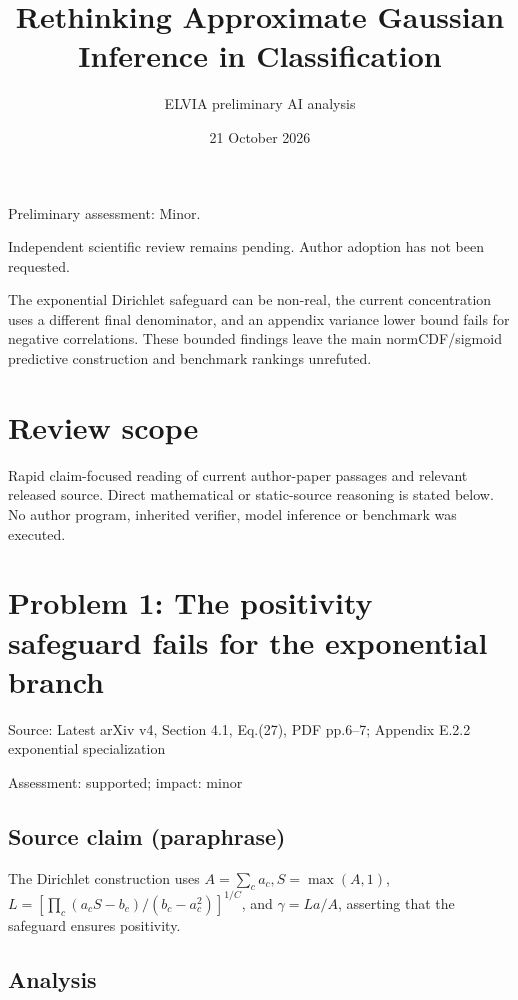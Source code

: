 \documentclass[11pt]{article}
\begin{document}
\title{Rethinking Approximate Gaussian Inference in Classification}

\author{ELVIA preliminary AI analysis}\date{21 October 2026}\maketitle

Preliminary assessment: Minor.\par

Independent scientific review remains pending. Author adoption has not been requested.

The exponential Dirichlet safeguard can be non-real, the current concentration uses a different final denominator, and an appendix variance lower bound fails for negative correlations. These bounded findings leave the main normCDF/sigmoid predictive construction and benchmark rankings unrefuted.

\section*{Review scope}

Rapid claim-focused reading of current author-paper passages and relevant released source. Direct mathematical or static-source reasoning is stated below. No author program, inherited verifier, model inference or benchmark was executed.

\section*{Problem 1: The positivity safeguard fails for the exponential branch}

Source: Latest arXiv v4, Section 4.1, Eq.(27), PDF pp.6–7; Appendix E.2.2 exponential specialization

Assessment: supported; impact: minor

\subsection*{Source claim (paraphrase)}

The Dirichlet construction uses \(A=\sum_ca_c,S=\max(A,1)\), \(L=[\prod_c(a_cS-b_c)/(b_c-a_c^2)]^{1/C}\), and \(\gamma=La/A\), asserting that the safeguard ensures positivity.

\subsection*{Analysis}
\end{document}
